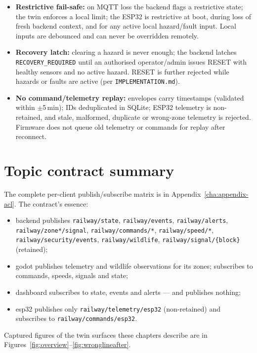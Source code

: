 \begin{itemize}
  \item \textbf{Restrictive fail-safe:} on MQTT loss the backend flags a
        restrictive state; the twin enforces a local limit; the ESP32 is
        restrictive at boot, during loss of fresh backend context, and
        for any active local hazard/fault input. Local inputs are
        debounced and can never be overridden remotely.
  \item \textbf{Recovery latch:} clearing a hazard is never enough; the
        backend latches \texttt{RECOVERY\_REQUIRED} until an authorised
        operator/admin issues RESET with healthy sensors and no active
        hazard. RESET is further rejected while hazards or faults are
        active (per \texttt{IMPLEMENTATION.md}).
  \item \textbf{No command/telemetry replay:} envelopes carry timestamps
        (validated within $\pm$5\,min); IDs deduplicated in SQLite;
        ESP32 telemetry is non-retained, and stale, malformed,
        duplicate or wrong-zone telemetry is rejected. Firmware does not
        queue old telemetry or commands for replay after reconnect.
\end{itemize}

\section{Topic contract summary}

The complete per-client publish/subscribe matrix is in
Appendix~\ref{cha:appendix-acl}. The contract's essence:

\begin{itemize}
  \item backend publishes \texttt{railway/state}, \texttt{railway/events},
        \texttt{railway/alerts}, \texttt{railway/zone*/signal},
        \texttt{railway/commands/*}, \texttt{railway/speed/*},
        \texttt{railway/security/events}, \texttt{railway/wildlife},
        \texttt{railway/signal/\{block\}} (retained);
  \item godot publishes telemetry and wildlife observations for its
        zones; subscribes to commands, speeds, signals and state;
  \item dashboard subscribes to state, events and alerts --- and
        publishes nothing;
  \item esp32 publishes only \texttt{railway/telemetry/esp32}
        (non-retained) and subscribes to \texttt{railway/commands/esp32}.
\end{itemize}

Captured figures of the twin surfaces these chapters describe are in
Figures~\ref{fig:overview}--\ref{fig:wronglineafter}.
